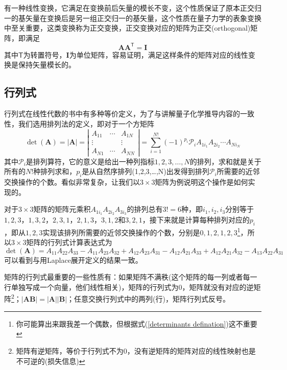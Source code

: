 \documentclass[12pt,a4paper,openany,twoside]{book}
\numberwithin{equation}{section}
\begin{document}
    有一种线性变换，它满足在变换前后矢量的模长不变，这个性质保证了原本正交归一的基矢量在变换后是另一组正交归一的基矢量，这个性质在量子力学的表象变换中至关重要，这类变换称为正交变换，正交变换对应的矩阵为正交(orthogonal)矩阵，即满足
    \begin{equation}
      \mathbf{A}\mathbf{A}^{\mathsf{T}}=\mathbf{I}
    \end{equation}
    其中$\mathsf{T}$为转置符号，$\mathbf{I}$为单位矩阵，容易证明，满足这样条件的矩阵对应的线性变换是保持矢量模长的。

    \subsection{行列式}
    行列式在线性代数的书中有多种等价定义，为了与讲解量子化学推导内容的一致性，我们选用排列法的定义，即对于一个方矩阵
    \begin{equation}
      \operatorname{det}(\mathbf{A})=|\mathbf{A}|=\left| \begin{array}{ccc}{A_{11}} & {\cdots} & {A_{1 N}} \\ {\vdots} & {} & {\vdots} \\ {A_{N 1}} & {\cdots} & {A_{N N}}\end{array}\right|=\sum_{i=1}^{N !}(-1)^{p_{i}} \mathscr{P}_{i} A_{1i_1} A_{2i_2} \cdots A_{N i_N}
      \label{determinants defination}
    \end{equation}
    其中$\mathscr{P}_i$是排列算符，它的意义是给出一种列指标$1,2,3,\dots,N$的排列，求和就是关于所有的$N!$种排列求和，$p_i$是从自然序排列(1,2,3,\dots,N)出发得到排列$\mathscr{P}_i$所需要的近邻交换操作的个数。看似非常复杂，让我们以$3\times3$矩阵为例说明这个操作是如何实现的。

    对于$3\times3$矩阵的矩阵元乘积$A_{1i_1} A_{2i_2}A_{3i_3}$的排列总有$3!=6$种，即$i_1,i_2,i_3$分别等于$1,2,3$，$1,3,2$，$2,3,1$，$2,1,3$，$3,1,2$和$3,2,1$，接下来就是计算每种排列对应的$p_i$，即从$1,2,3$实现该排列所需要的近邻交换操作的个数，分别是$0,1,2,1,2,3$\footnote{你可能算出来跟我差一个偶数，但根据式(\ref{determinants defination})这不重要}，所以$3\times3$矩阵的行列式计算表达式为
    \begin{equation}
      \operatorname{det}(\mathbf{A})=A_{11} A_{22}A_{33}-A_{11} A_{23}A_{32}+A_{12} A_{23}A_{31}-A_{12} A_{21}A_{33}+A_{12} A_{21}A_{32}-A_{13} A_{22}A_{31}
    \end{equation}
    可以看到与用Laplace展开定义的结果一致。

    矩阵的行列式最重要的一些性质有：如果矩阵不满秩(这个矩阵的每一列或者每一行单独写成一个向量，他们线性相关)，矩阵的行列式为0，矩阵就没有对应的逆矩阵\footnote{矩阵有逆矩阵，等价于行列式不为0，没有逆矩阵的矩阵对应的线性映射也是不可逆的(损失信息)}；$|\mathbf{A B}|=|\mathbf{A}||\mathbf{B}|$；任意交换行列式中的两列(行)，矩阵行列式反号。
\end{document}
